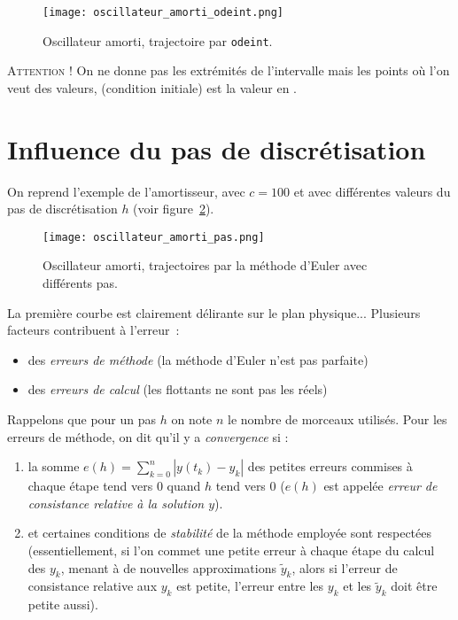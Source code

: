 \clearslide{}

\begin{figure}[!h]
    \begin{center}
        \texttt{[image: oscillateur\_amorti\_odeint.png]}
        \caption{Oscillateur amorti, trajectoire par \texttt{odeint}.}
        \label{11:fig:oscillateur_amorti_odeint}
    \end{center}
\end{figure}
\textsc{Attention !} On ne donne pas les extrémités de l'intervalle mais les points  où l'on veut des valeurs,  (condition initiale) est la valeur en
  .

\clearslide{}


\section{Influence du pas de discrétisation}
On reprend l'exemple de l'amortisseur, avec $c=100$ et avec
différentes valeurs du pas de discrétisation $h$ (voir figure~\ref{11:fig:oscillateur_amorti_pas}).

\begin{figure}[!h]
    \begin{center}
        \texttt{[image: oscillateur\_amorti\_pas.png]}
        \caption{Oscillateur amorti, trajectoires par la méthode d'Euler avec différents pas.}
        \label{11:fig:oscillateur_amorti_pas}
    \end{center}
\end{figure}

La première courbe est clairement délirante sur le plan physique...
Plusieurs facteurs contribuent à l'erreur~:

\begin{itemize}
\item des \emph{erreurs de méthode} (la méthode d'Euler n'est pas parfaite)
\item des \emph{erreurs de calcul} (les flottants ne sont pas les réels)
\end{itemize}

\clearslide{}
Rappelons que pour un pas $h$ on note $n$ le nombre de morceaux utilisés. Pour les erreurs de méthode, on dit qu'il y a \emph{convergence} si :
\begin{enumerate}
\item la somme $e(h)=\displaystyle\sum_{k=0}^n |y(t_k)-y_k|$ des petites erreurs 
commises à 
chaque étape tend vers $0$ quand $h$ tend vers $0$ ($e(h)$ est appelée 
  \emph{erreur de consistance relative à la solution $y$}).
\item et certaines conditions de \emph{stabilité} de la méthode employée sont
  respectées (essentiellement, si l'on commet une petite erreur à chaque étape du calcul des $y_k$, 
  menant à de nouvelles approximations $\tilde{y}_k$, alors si l'erreur de consistance relative aux $y_k$
  est petite, l'erreur entre les $y_k$ et les $\tilde{y}_k$ doit être petite aussi).
\end{enumerate}

